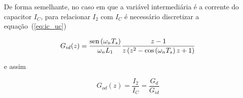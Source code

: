     De forma semelhante, no caso em que a variável intermediária é a corrente do
    capacitor $I_C$, para relacionar $I_2$ com $I_C$ é necessário discretizar a
    equação~(\ref{eq:ic_uc})

    \begin{equation}
        G_{id}(z) = \frac{\operatorname{sen} \left( \omega_n T_s \right)}{\omega_n L_1}
            \frac{z-1}{z \left( z^2 - \cos \left( \omega_n T_s \right) z + 1 \right)}
    \end{equation}

    e assim

    \begin{equation}
        G_{od}(z) = \frac{I_2}{I_C} = \frac{G_d}{G_{id}}
    \end{equation}


